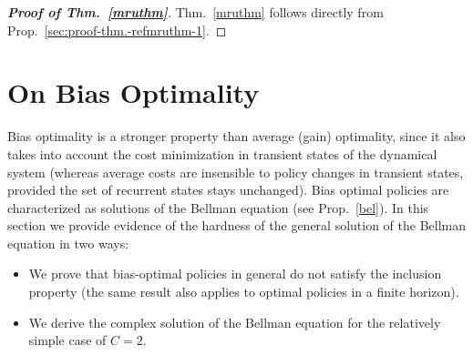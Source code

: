 \documentclass[11pt,a4paper]{article}
\theoremstyle{definition}
\theoremstyle{remark}
\begin{document}
\begin{proof}[{\bf Proof of Thm.~\ref{mruthm}}]
  Thm.~\ref{mruthm} follows directly from 
  Prop.~\ref{sec:proof-thm.-refmruthm-1}.
\end{proof}

\section{On Bias Optimality}
\label{sec:ih}

Bias optimality is a stronger property than average (gain) optimality, since it
also takes into account the cost minimization in transient states of the
dynamical system (whereas average costs are insensible to policy changes in
transient states, provided the set of recurrent states stays unchanged).
Bias optimal policies are characterized as solutions of the Bellman equation
(see Prop.~\ref{bel}). In this section we provide evidence of the hardness of
the general solution of the Bellman equation in two ways:
\begin{itemize}
\item We prove that bias-optimal policies in general do not satisfy the
  inclusion property (the same result also applies to optimal policies in a
  finite horizon).
\item We derive the complex solution of the Bellman equation for the relatively
  simple case of $C=2$.
\end{itemize}
\end{document}
